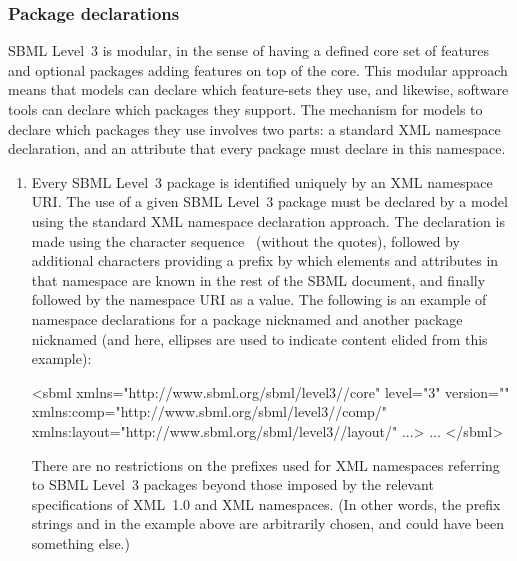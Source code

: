 \subsubsection{Package declarations}
\label{sec:sbml-packages}

SBML Level~3 is modular, in the sense of having a defined core set
of features and optional packages adding features on top of the
core.  This modular approach means that models can declare which
feature-sets they use, and likewise, software tools can declare
which packages they support.  The mechanism for models to declare
which packages they use involves two parts: a standard XML
namespace declaration, and an attribute that every package must
declare in this namespace.
\begin{enumerate}

\item Every SBML Level~3 package is identified uniquely by an XML
  namespace URI.  The use of a given SBML Level~3 package must be
  declared by a model using the standard XML namespace declaration
  approach.  The declaration is made using the character sequence
  \ (without the quotes), followed by additional
  characters providing a prefix by which elements and attributes
  in that namespace are known in the rest of the SBML document,
  and finally followed by the namespace URI as a value.  The
  following is an example of namespace declarations for a package
  nicknamed  and another package nicknamed 
  (and here, ellipses are used to indicate content elided from
  this example):
  \begin{example}
<sbml xmlns="http://www.sbml.org/sbml/level3/\thisvlc/core" level="3" version="\sbmlversionnum"
      xmlns:comp="http://www.sbml.org/sbml/level3/\thisvlc/comp/\thisvlc"
      xmlns:layout="http://www.sbml.org/sbml/level3/\thisvlc/layout/\thisvlc" ...>
  ...  
</sbml>\end{example}
  There are no restrictions on the prefixes used for XML namespaces
  referring to SBML Level~3 packages beyond those imposed by the
  relevant specifications of XML~1.0 and XML namespaces.  (In other
  words, the prefix strings  and  in the
  example above are arbitrarily chosen, and could have been
  something else.)


\end{enumerate}
